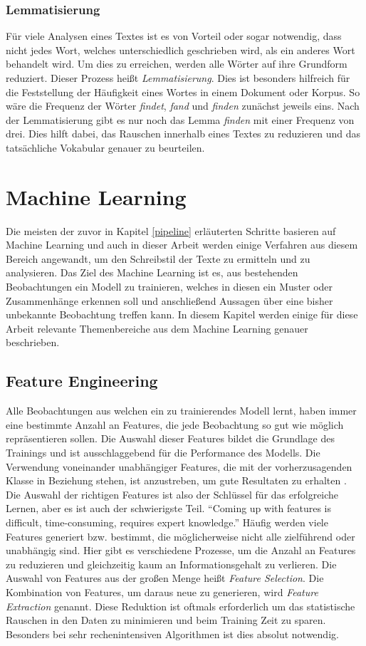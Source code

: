 \subsubsection*{Lemmatisierung}
Für viele Analysen eines Textes ist es von Vorteil oder sogar notwendig, dass nicht jedes Wort, welches unterschiedlich geschrieben wird, als ein anderes Wort behandelt wird. Um dies zu erreichen, werden alle Wörter auf ihre Grundform reduziert. Dieser Prozess heißt \emph{Lemmatisierung}. Dies ist besonders hilfreich für die Feststellung der Häufigkeit eines Wortes in einem Dokument oder Korpus. So wäre die Frequenz der Wörter \textit{findet}, \textit{fand} und \textit{finden} zunächst jeweils eins. Nach der Lemmatisierung gibt es nur noch das Lemma \textit{finden} mit einer Frequenz von drei. Dies hilft dabei, das Rauschen innerhalb eines Textes zu reduzieren und das tatsächliche Vokabular genauer zu beurteilen.

\section{Machine Learning}
Die meisten der zuvor in Kapitel \ref{pipeline} erläuterten Schritte basieren auf Machine Learning und auch in dieser Arbeit werden einige Verfahren aus diesem Bereich angewandt, um den Schreibstil der Texte zu ermitteln und zu analysieren. Das Ziel des Machine Learning ist es, aus bestehenden Beobachtungen ein Modell zu trainieren, welches in diesen ein Muster oder Zusammenhänge erkennen soll und anschließend Aussagen über eine bisher unbekannte Beobachtung treffen kann. In diesem Kapitel werden einige für diese Arbeit relevante Themenbereiche aus dem Machine Learning genauer beschrieben.

\subsection{Feature Engineering}
Alle Beobachtungen aus welchen ein zu trainierendes Modell lernt, haben immer eine bestimmte Anzahl an Features, die jede Beobachtung so gut wie möglich repräsentieren sollen. Die Auswahl dieser Features bildet die Grundlage des Trainings und ist ausschlaggebend für die Performance des Modells. Die Verwendung voneinander unabhängiger Features, die mit der vorherzusagenden Klasse in Beziehung stehen, ist anzustreben, um gute Resultaten zu erhalten \cite[Kap.~8]{domingos2012few}. Die Auswahl der richtigen Features ist also der Schlüssel für das erfolgreiche Lernen, aber es ist auch der schwierigste Teil. "`Coming up with features is difficult, time-consuming, requires expert knowledge."' \cite{ng2013machine} Häufig werden viele Features generiert bzw. bestimmt, die möglicherweise nicht alle zielführend oder unabhängig sind. Hier gibt es verschiedene Prozesse, um die Anzahl an Features zu reduzieren und gleichzeitig kaum an Informationsgehalt zu verlieren. Die Auswahl von Features aus der großen Menge heißt \emph{Feature Selection}. Die Kombination von Features, um daraus neue zu generieren, wird \emph{Feature Extraction} genannt. Diese Reduktion ist oftmals erforderlich um das statistische Rauschen in den Daten zu minimieren und beim Training Zeit zu sparen. Besonders bei sehr rechenintensiven Algorithmen ist dies absolut notwendig.

